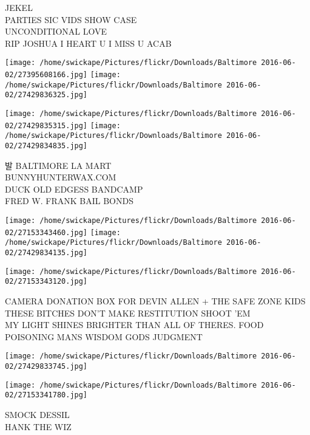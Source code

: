 \documentclass[10pt,letterpaper]{article}
\begin{document}
JEKEL\\
PARTIES SIC VIDS SHOW CASE\\
UNCONDITIONAL LOVE\\
RIP JOSHUA I HEART U I MISS U ACAB\\
\pagebreak

\texttt{[image: /home/swickape/Pictures/flickr/Downloads/Baltimore 2016-06-02/27395608166.jpg]}
\texttt{[image: /home/swickape/Pictures/flickr/Downloads/Baltimore 2016-06-02/27429836325.jpg]}

\texttt{[image: /home/swickape/Pictures/flickr/Downloads/Baltimore 2016-06-02/27429835315.jpg]}
\texttt{[image: /home/swickape/Pictures/flickr/Downloads/Baltimore 2016-06-02/27429834835.jpg]}

발 BALTIMORE LA MART\\
BUNNYHUNTERWAX.COM\\
DUCK OLD EDGESS BANDCAMP\\
FRED W. FRANK BAIL BONDS\\
\pagebreak

\texttt{[image: /home/swickape/Pictures/flickr/Downloads/Baltimore 2016-06-02/27153343460.jpg]}
\texttt{[image: /home/swickape/Pictures/flickr/Downloads/Baltimore 2016-06-02/27429834135.jpg]}

\texttt{[image: /home/swickape/Pictures/flickr/Downloads/Baltimore 2016-06-02/27153343120.jpg]}

CAMERA DONATION BOX FOR DEVIN ALLEN + THE SAFE ZONE KIDS\\
THESE BITCHES DON'T MAKE RESTITUTION SHOOT 'EM\\
MY LIGHT SHINES BRIGHTER THAN ALL OF THERES.  FOOD POISONING MANS WISDOM GODS JUDGMENT\\
\pagebreak

\texttt{[image: /home/swickape/Pictures/flickr/Downloads/Baltimore 2016-06-02/27429833745.jpg]}

\vspace{0.25in}
\texttt{[image: /home/swickape/Pictures/flickr/Downloads/Baltimore 2016-06-02/27153341780.jpg]}

SMOCK DESSIL\\
HANK THE WIZ\\
\pagebreak
\end{document}
